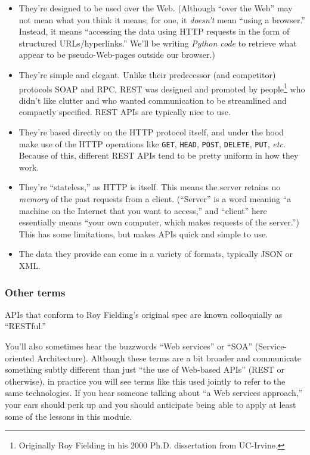\documentclass[12pt]{article}
\begin{document}
\begin{itemize}
\itemsep.1em

\item They're designed to be used over the Web. (Although ``over the Web'' may
not mean what you think it means; for one, it \textit{doesn't} mean ``using a
browser.'' Instead, it means ``accessing the data using HTTP requests in the
form of structured URLs/hyperlinks.'' We'll be writing \textit{Python code} to
retrieve what appear to be pseudo-Web-pages outside our browser.)

\item They're simple and elegant. Unlike their predecessor (and competitor)
protocols SOAP and RPC, REST was designed and promoted by
people\footnote{Originally Roy Fielding in his 2000 Ph.D. dissertation from
UC-Irvine.} who didn't like clutter and who wanted communication to be
streamlined and compactly specified. REST APIs are typically nice to use.

\item They're based directly on the HTTP protocol itself, and under the hood
make use of the HTTP operations like \texttt{GET}, \texttt{HEAD},
\texttt{POST}, \texttt{DELETE}, \texttt{PUT}, \textit{etc.} Because of this,
different REST APIs tend to be pretty uniform in how they work.

\item They're ``stateless,'' as HTTP is itself. This means the server retains
no \textit{memory} of the past requests from a client. (``Server'' is a word
meaning ``a machine on the Internet that you want to access,'' and ``client''
here essentially means ``your own computer, which makes requests of the
server.'') This has some limitations, but makes APIs quick and simple to use.

\item The data they provide can come in a variety of formats, typically JSON
or XML.

\end{itemize}

\subsubsection{Other terms}

APIs that conform to Roy Fielding's original spec are known colloquially as
``RESTful.'' 

You'll also sometimes hear the buzzwords ``Web services'' or ``SOA''
(Service-oriented Architecture). Although these terms are a bit broader and
communicate something subtly different than just ``the use of Web-based APIs''
(REST or otherwise), in practice you will see terms like this used jointly to
refer to the same technologies. If you hear someone talking about ``a Web
services approach,'' your ears should perk up and you should anticipate being
able to apply at least some of the lessons in this module.
\end{document}
